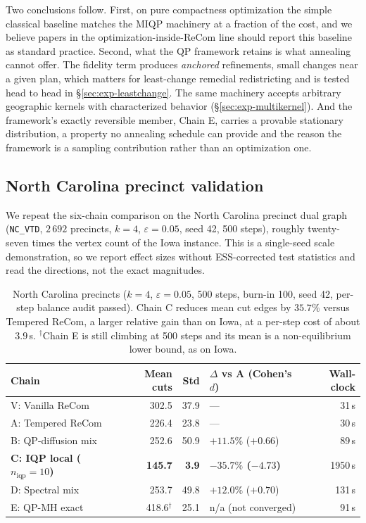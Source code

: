 \documentclass[11pt]{article}
\begin{document}
Two conclusions follow. First, on pure compactness optimization the
simple classical baseline matches the MIQP machinery at a fraction of
the cost, and we believe papers in the optimization-inside-ReCom line
should report this baseline as standard practice. Second, what the QP
framework retains is what annealing cannot offer. The fidelity term
produces \emph{anchored} refinements, small changes near a given
plan, which matters for least-change remedial redistricting and is
tested head to head in \S\ref{sec:exp-leastchange}. The same
machinery accepts arbitrary geographic kernels with characterized
behavior (\S\ref{sec:exp-multikernel}). And the framework's exactly
reversible member, Chain E, carries a provable stationary
distribution, a property no annealing schedule can provide and the
reason the framework is a sampling contribution rather than an
optimization one.

\subsection{North Carolina precinct validation}\label{sec:exp-nc}
We repeat the six-chain comparison on the North Carolina precinct dual
graph (\texttt{NC\_VTD}, $2\,692$ precincts, $k = 4$,
$\varepsilon = 0.05$, seed 42, 500 steps), roughly twenty-seven times
the vertex count of the Iowa instance. This is a single-seed scale
demonstration, so we report effect sizes without ESS-corrected test
statistics and read the directions, not the exact magnitudes.

\begin{table}[H]
\centering
\small
\begin{tabular}{lrrlr}
\toprule
Chain & Mean cuts & Std & $\Delta$ vs A (Cohen's $d$) & Wall-clock \\
\midrule
V: Vanilla ReCom    & 302.5 & 37.9 & ---                & 31\,s \\
A: Tempered ReCom   & 226.4 & 23.8 & ---                & 30\,s \\
B: QP-diffusion mix & 252.6 & 50.9 & $+11.5\%$ ($+0.66$) & 89\,s \\
\textbf{C: IQP local ($n_{\mathrm{iqp}} = 10$)}
                    & \textbf{145.7} & \textbf{3.9}
                    & \textbf{$-35.7\%$ ($-4.73$)} & 1950\,s \\
D: Spectral mix     & 253.7 & 49.8 & $+12.0\%$ ($+0.70$) & 131\,s \\
E: QP-MH exact      & 418.6$^{\dagger}$ & 25.1 & n/a (not converged) & 91\,s \\
\bottomrule
\end{tabular}
\caption{North Carolina precincts ($k = 4$, $\varepsilon = 0.05$,
  500 steps, burn-in 100, seed 42, per-step balance audit passed).
  Chain C reduces mean cut edges by $35.7\%$ versus Tempered ReCom,
  a larger relative gain than on Iowa, at a per-step cost of about
  $3.9$\,s. $^{\dagger}$Chain E is still climbing at 500 steps and its
  mean is a non-equilibrium lower bound, as on Iowa.}\label{tab:nc-headline}
\end{table}
\end{document}
